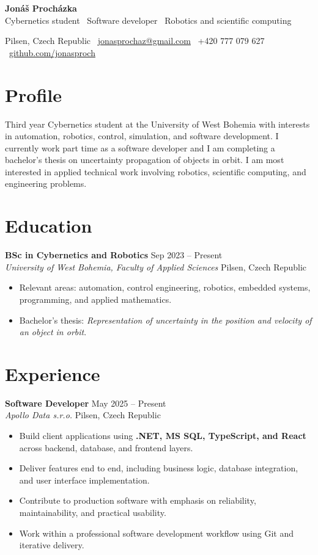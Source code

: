 \documentclass[11pt,a4paper]{article}
\newcommand{\cvname}[1]{{\fontsize{24}{28}\selectfont\bfseries\color{accent} #1}}
\newcommand{\cvtag}[1]{{\large\color{muted} #1}}
\newcommand{\cvmeta}[1]{{\small\color{muted} #1}}
\newcommand{\entry}[4]{%
  \textbf{#1} \hfill {\small #2}\\
  {\textit{#3}} \hfill {\small\color{muted} #4}\\[-0.15em]
}
\begin{document}
\cvname{Jon\'a\v{s} Proch\'azka}\\[0.15em]
\cvtag{Cybernetics student \textbar\ Software developer \textbar\ Robotics and scientific computing}

\vspace{0.4em}
\cvmeta{Pilsen, Czech Republic \textbar\ \href{mailto:jonasprochaz@gmail.com}{jonasprochaz@gmail.com} \textbar\ +420 777 079 627 \textbar\ \href{https://github.com/jonasproch}{github.com/jonasproch}}

\section*{Profile}
\justifying
Third year Cybernetics student at the University of West Bohemia with interests in automation, robotics, control, simulation, and software development. I currently work part time as a software developer and I am completing a bachelor's thesis on uncertainty propagation of objects in orbit. I am most interested in applied technical work involving robotics, scientific computing, and engineering problems.
\section*{Education}
\entry{BSc in Cybernetics and Robotics}{Sep 2023 -- Present}{University of West Bohemia, Faculty of Applied Sciences}{Pilsen, Czech Republic}
\begin{itemize}
  \item Relevant areas: automation, control engineering, robotics, embedded systems, programming, and applied mathematics.
  \item Bachelor's thesis: \textit{Representation of uncertainty in the position and velocity of an object in orbit}.
\end{itemize}

\section*{Experience}
\entry{Software Developer}{May 2025 -- Present}{Apollo Data s.r.o.}{Pilsen, Czech Republic}
\begin{itemize}
  \item Build client applications using \textbf{.NET, MS SQL, TypeScript, and React} across backend, database, and frontend layers.
  \item Deliver features end to end, including business logic, database integration, and user interface implementation.
  \item Contribute to production software with emphasis on reliability, maintainability, and practical usability.
  \item Work within a professional software development workflow using Git and iterative delivery.
\end{itemize}
\end{document}

